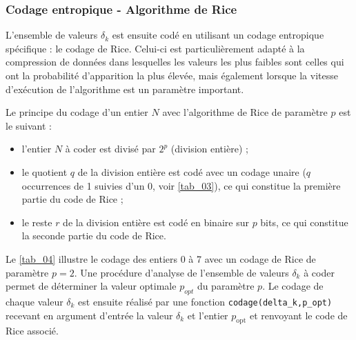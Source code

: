 \documentclass[10pt,fleqn]{article} %
\begin{document}
\subsubsection{Codage entropique - Algorithme de Rice}

\ifprof
\else

L’ensemble de valeurs $\delta_k$ est ensuite codé en utilisant un codage entropique spécifique : le codage
de Rice. Celui-ci est particulièrement adapté à la compression de données dans lesquelles
les valeurs les plus faibles sont celles qui ont la probabilité d’apparition la plus élevée, mais
également lorsque la vitesse d’exécution de l’algorithme est un paramètre important.


Le principe du codage d’un entier $N$ avec l’algorithme de Rice de paramètre $p$ est le suivant :
\begin{itemize}
\item l’entier $N$ à coder est divisé par $2^p$ (division entière) ;
\item le quotient $q$ de la division entière est codé avec un codage unaire ($q$ occurrences de 1
suivies d’un 0, voir \autoref{tab_03}), ce qui constitue la première partie du code de Rice ;
\item le reste $r$ de la division entière est codé en binaire sur $p$ bits, ce qui constitue la seconde
partie du code de Rice.
\end{itemize}
Le \autoref{tab_04} illustre le codage des entiers 0 à 7 avec un codage de Rice de paramètre $p = 2$.
Une procédure d’analyse de l’ensemble de valeurs $\delta_k$ à coder permet de déterminer la valeur
optimale $p_{opt}$ du paramètre $p$. Le codage de chaque valeur $\delta_k$ est ensuite réalisé par une fonction
\texttt{codage(delta\_k,p\_opt)} recevant en argument d’entrée la valeur $\delta_k$ et l’entier $p_{\text{opt}}$ et renvoyant
le code de Rice associé.
\end{document}
